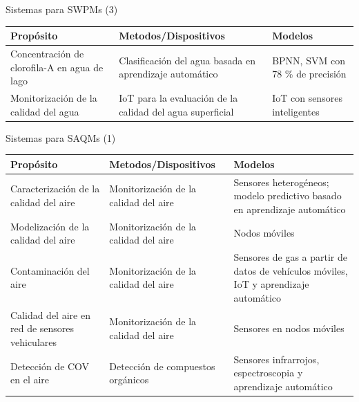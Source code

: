 \documentclass[aspectratio=169,compress]{beamer}
\begin{document}
\begin{frame}{Sistemas para SWPMs (3)}
\begin{center}
\footnotesize
\begin{tabular}{p{4.5cm}|p{4.5cm}|p{4.5cm}}
\hline
\textbf{Propósito} & \textbf{Metodos/Dispositivos} & \textbf{Modelos} \\
\hline

Concentración de clorofila-A en agua de lago &
Clasificación del agua basada en aprendizaje automático &
BPNN, SVM con 78 \% de precisión \\  \hline

Monitorización de la calidad del agua &
IoT para la evaluación de la calidad del agua superficial &
IoT con sensores inteligentes \\  \hline

\end{tabular}
\end{center}

\end{frame}


\begin{frame}{Sistemas para SAQMs (1)}
\begin{center}
\footnotesize
\begin{tabular}{p{4.5cm}|p{4.5cm}|p{4.5cm}}
\hline
\textbf{Propósito} & \textbf{Metodos/Dispositivos} & \textbf{Modelos} \\
\hline

Caracterización de la calidad del aire &
Monitorización de la calidad del aire &
Sensores heterogéneos; modelo predictivo basado en aprendizaje automático \\  \hline

Modelización de la calidad del aire &
Monitorización de la calidad del aire & 
Nodos móviles \\  \hline

Contaminación del aire &
Monitorización de la calidad del aire &
Sensores de gas a partir de datos de vehículos móviles, IoT y aprendizaje automático \\  \hline

Calidad del aire en red de sensores vehiculares &
Monitorización de la calidad del aire &
Sensores en nodos móviles \\  \hline

Detección de COV en el aire &
Detección de compuestos orgánicos &
Sensores infrarrojos, espectroscopia y aprendizaje automático \\  \hline


\end{tabular}
\end{center}

\end{frame}
\end{document}
